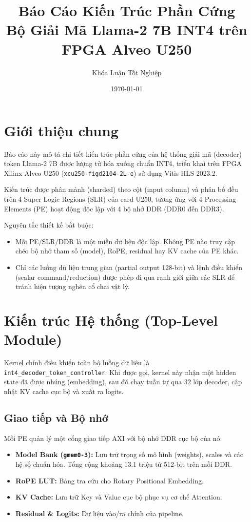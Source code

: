 \documentclass[12pt,a4paper]{article}
\title{\textbf{Báo Cáo Kiến Trúc Phần Cứng}\\ \Large Bộ Giải Mã Llama-2 7B INT4 trên FPGA Alveo U250}
\author{Khóa Luận Tốt Nghiệp}
\date{\today}
\begin{document}
\maketitle
\tableofcontents
\newpage

\section{Giới thiệu chung}
Báo cáo này mô tả chi tiết kiến trúc phần cứng của hệ thống giải mã (decoder) token Llama-2 7B được lượng tử hóa xuống chuẩn INT4, triển khai trên FPGA Xilinx Alveo U250 (\texttt{xcu250-figd2104-2L-e}) sử dụng Vitis HLS 2023.2. 

Kiến trúc được phân mảnh (sharded) theo cột (input column) và phân bố đều trên 4 Super Logic Regions (SLR) của card U250, tương ứng với 4 Processing Elements (PE) hoạt động độc lập với 4 bộ nhớ DDR (DDR0 đến DDR3). 

Nguyên tắc thiết kế bắt buộc:
\begin{itemize}
    \item Mỗi PE/SLR/DDR là một miền dữ liệu độc lập. Không PE nào truy cập chéo bộ nhớ tham số (model), RoPE, residual hay KV cache của PE khác.
    \item Chỉ các luồng dữ liệu trung gian (partial output 128-bit) và lệnh điều khiển (scalar command/reduction) được phép đi qua ranh giới giữa các SLR để tránh hiện tượng nghẽn cổ chai vật lý.
\end{itemize}

\section{Kiến trúc Hệ thống (Top-Level Module)}
Kernel chính điều khiển toàn bộ luồng dữ liệu là \texttt{int4\_decoder\_token\_controller}. Khi được gọi, kernel này nhận một hidden state đã được nhúng (embedding), sau đó chạy tuần tự qua 32 lớp decoder, cập nhật KV cache cục bộ và xuất ra logits.

\subsection{Giao tiếp và Bộ nhớ}
Mỗi PE quản lý một cổng giao tiếp AXI với bộ nhớ DDR cục bộ của nó:
\begin{itemize}
    \item \textbf{Model Bank (\texttt{gmem0-3}):} Lưu trữ trọng số mô hình (weights), scales và các hệ số chuẩn hóa. Tổng cộng khoảng $13.1$ triệu từ 512-bit trên mỗi DDR.
    \item \textbf{RoPE LUT:} Bảng tra cứu cho Rotary Positional Embedding.
    \item \textbf{KV Cache:} Lưu trữ Key và Value cục bộ phục vụ cơ chế Attention.
    \item \textbf{Residual \& Logits:} Dữ liệu vào/ra chính của pipeline.
\end{itemize}
\end{document}
